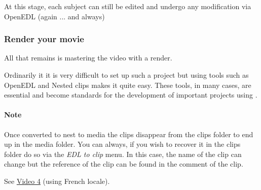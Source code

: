 At this stage, each subject can still be edited and undergo any modification via OpenEDL (again ... and always)

\subsubsection*{Render your movie}
\label{ssub:render_movie}

All that remains is mastering the video with a render.

Ordinarily it it is very difficult to set up such a project but using tools such as OpenEDL and Nested clips makes it quite easy. These tools, in many cases, are essential and become standards for the development of important projects using \CGG{}.

\paragraph{Note}

Once converted to nest to media the clips disappear from the clips folder to end up in the media folder. You can always, if you wish to recover it in the clips folder do so via the \textit{EDL to clip} menu. In this case, the name of the clip can change but the reference of the clip can be found in the comment of the clip.

See \href{https://youtu.be/bfYaBqVbdCo}{Video 4} (using French locale).

